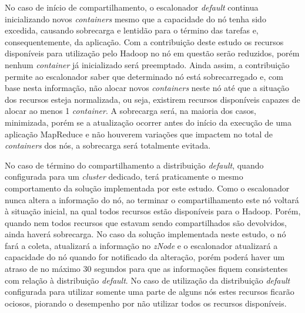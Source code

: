 No caso de início de compartilhamento, o escalonador \textit{default} continua inicializando novos \textit{containers} mesmo que a capacidade do nó tenha sido excedida, causando sobrecarga e lentidão para o término das tarefas e, consequentemente, da aplicação. Com a contribuição deste estudo os recursos disponíveis para utilização pelo Hadoop no nó em questão serão reduzidos, porém nenhum \textit{container} já inicializado será preemptado. Ainda assim, a contribuição permite ao escalonador saber que determinado nó está sobrecarregado e, com base nesta informação, não alocar novos \textit{containers} neste nó até que a situação dos recursos esteja normalizada, ou seja, existirem recursos disponíveis capazes de alocar ao menos 1 \textit{container}. A sobrecarga será, na maioria dos casos, minimizada, porém se a atualização ocorrer antes do início da execução de uma aplicação MapReduce e não houverem variações que impactem no total de \textit{containers} dos nós, a sobrecarga será totalmente evitada.

No caso de término do compartilhamento a distribuição \textit{default}, quando configurada para um \textit{cluster} dedicado, terá praticamente o mesmo comportamento da solução implementada por este estudo. Como o escalonador nunca altera a informação do nó, ao terminar o compartilhamento este nó voltará à situação inicial, na qual todos recursos estão disponíveis para o Hadoop. Porém, quando nem todos recursos que estavam sendo compartilhados são devolvidos, ainda haverá sobrecarga. No caso da solução implementada neste estudo, o nó fará a coleta, atualizará a informação no \textit{zNode} e o escalonador atualizará a capacidade do nó quando for notificado da alteração, porém poderá haver um atraso de no máximo 30 segundos para que as informações fiquem consistentes com relação à distribuição \textit{default}. No caso de utilização da distribuição \textit{default} configurada para utilizar somente uma parte de alguns nós estes recursos ficarão ociosos, piorando o desempenho por não utilizar todos os recursos disponíveis.
